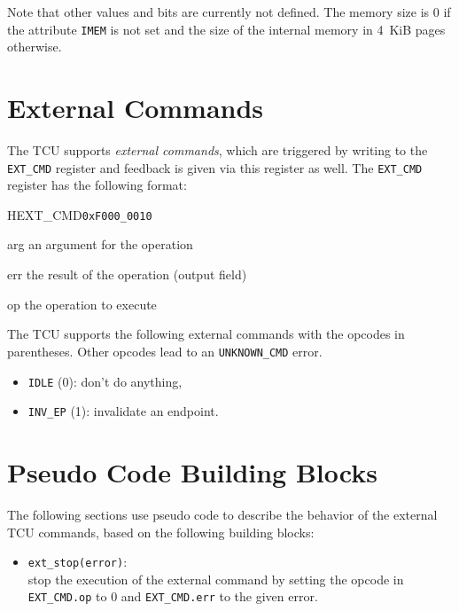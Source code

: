 \noindent Note that other values and bits are currently not defined. The memory size is 0 if the
attribute \texttt{IMEM} is not set and the size of the internal memory in 4~KiB pages otherwise.

\section{External Commands}

The TCU supports \emph{external commands}, which are triggered by writing to the \texttt{EXT\_CMD}
register and feedback is given via this register as well. The \texttt{EXT\_CMD} register has the
following format:

\begin{register}{H}{EXT\_CMD}{\texttt{0xF000\_0010}}
  \regnewline%
  \begin{regdesc}\begin{reglist}
    \item[arg] an argument for the operation
    \item[err] the result of the operation (output field)
    \item[op] the operation to execute
  \end{reglist}\end{regdesc}
\end{register}

The TCU supports the following external commands with the opcodes in parentheses. Other opcodes lead
to an \texttt{UNKNOWN\_CMD} error.

\begin{itemize}
  \item \texttt{IDLE} (0): don't do anything,
  \item \texttt{INV\_EP} (1): invalidate an endpoint.
\end{itemize}

\section{Pseudo Code Building Blocks}
\label{sec:extcmdspseudo}

The following sections use pseudo code to describe the behavior of the external TCU commands, based
on the following building blocks:

\begin{itemize}
  \item \texttt{ext\_stop(error)}:\\
  stop the execution of the external command by setting the opcode in \texttt{EXT\_CMD.op} to 0 and
  \texttt{EXT\_CMD.err} to the given error.
\end{itemize}


